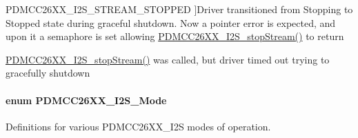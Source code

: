 \begin{Desc}
\begin{description}
{P\+D\+M\+C\+C26\+X\+X\+\_\+\+I2\+S\+\_\+\+S\+T\+R\+E\+A\+M\+\_\+\+S\+T\+O\+P\+P\+E\+D\label{_p_d_m_c_c26_x_x__util_8h_ac1e4fbeb33409a874015d4e0609ddff1a0c245201c506bf7eacfb9f0f451e33dd}
}]Driver transitioned from Stopping to Stopped state during graceful shutdown. Now a pointer error is expected, and upon it a semaphore is set allowing \hyperlink{_p_d_m_c_c26_x_x__util_8h_abe6c63029970621defb60aaa467d9b6c}{P\+D\+M\+C\+C26\+X\+X\+\_\+\+I2\+S\+\_\+stop\+Stream()} to return \item[{\em 
P\+D\+M\+C\+C26\+X\+X\+\_\+\+I2\+S\+\_\+\+S\+T\+R\+E\+A\+M\+\_\+\+F\+A\+I\+L\+E\+D\+\_\+\+T\+O\+\_\+\+S\+T\+O\+P\label{_p_d_m_c_c26_x_x__util_8h_ac1e4fbeb33409a874015d4e0609ddff1a895fc1d5ca5ab81c4c7c7223c0b8b6a5}
}]\hyperlink{_p_d_m_c_c26_x_x__util_8h_abe6c63029970621defb60aaa467d9b6c}{P\+D\+M\+C\+C26\+X\+X\+\_\+\+I2\+S\+\_\+stop\+Stream()} was called, but driver timed out trying to gracefully shutdown \end{description}
\end{Desc}
\paragraph[{P\+D\+M\+C\+C26\+X\+X\+\_\+\+I2\+S\+\_\+\+Mode}]{\setlength{\rightskip}{0pt plus 5cm}enum {\bf P\+D\+M\+C\+C26\+X\+X\+\_\+\+I2\+S\+\_\+\+Mode}}\label{_p_d_m_c_c26_x_x__util_8h_a7392b654a84f42e717a4df1485058a84}


Definitions for various P\+D\+M\+C\+C26\+X\+X\+\_\+\+I2\+S modes of operation. 

